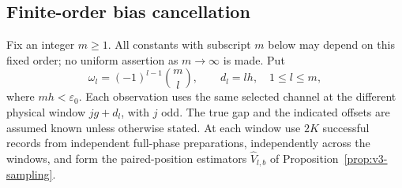 \subsection{Finite-order bias cancellation}
Fix an integer $m\ge1$. All constants with subscript $m$ below may
depend on this fixed order; no uniform assertion as $m\to\infty$ is
made. Put
\begin{equation}\label{eq:v4-richardson}
 \omega_l=(-1)^{l-1}\binom ml,\qquad d_l=lh,
                     \quad 1\le l\le m,
\end{equation}
where $mh<\varepsilon_0$. Each observation uses the same selected
channel at the different physical window $jg+d_l$, with $j$ odd.
The true gap and the indicated offsets are assumed known unless
otherwise stated. At each window use $2K$ successful records from
independent full-phase preparations, independently across the windows,
and form the paired-position estimators
$\widehat V_{l,b}$ of Proposition~\ref{prop:v3-sampling}.

